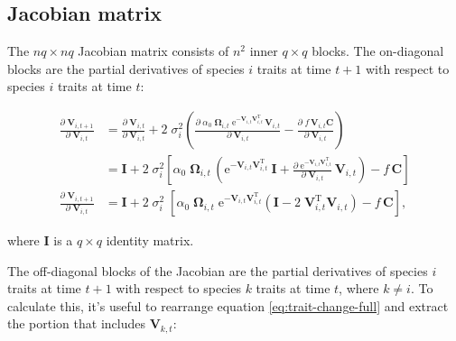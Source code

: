 \subsection*{Jacobian matrix}

The $nq \times nq$ Jacobian matrix consists of $n^2$ inner $q \times q$ blocks.
The on-diagonal blocks are the partial derivatives of species $i$ traits at time $t+1$ with respect
to species $i$ traits at time $t$:

\begin{equation*}
\begin{split}
    \frac{ \partial \; \mathbf{V}_{i,t+1} }{ \partial \; \mathbf{V}_{i,t} } &=
        \frac{ \partial \; \mathbf{V}_{i,t} }{ \partial \; \mathbf{V}_{i,t} } +
        2 \; \sigma_i^2
        \left(
            \frac{ \partial \;
                \alpha_0 \; \mathbf{\Omega}_{i,t} \;
                    \textrm{e}^{-\mathbf{V}_{i,t} \mathbf{V}_{i,t}^\textrm{T}} \,
                    \mathbf{V}_{i,t}}{\partial \; \mathbf{V}_{i,t} } -
            \frac{ \partial \; f \, \mathbf{V}_{i,t} \mathbf{C}}{\partial \; \mathbf{V}_{i,t} }
        \right) \\
    &=
        \mathbf{I} +
        2 \; \sigma_i^2
        \left[
            \alpha_0 \; \mathbf{\Omega}_{i,t} \,
            \left(
                \textrm{e}^{-\mathbf{V}_{i,t} \mathbf{V}_{i,t}^\textrm{T}} \: \mathbf{I} +
                \frac{ \partial \;
                        \textrm{e}^{-\mathbf{V}_{i,t} \mathbf{V}_{i,t}^\textrm{T}}
                        }{\partial \; \mathbf{V}_{i,t} } \, \mathbf{V}_{i,t}
            \right) -
            f \, \mathbf{C}
            \right] \\[2ex]
    \frac{ \partial \; \mathbf{V}_{i,t+1} }{ \partial \; \mathbf{V}_{i,t} } &= \mathbf{I} +
        2 \; \sigma_i^2 \;
        \left[
            \alpha_0 \; \mathbf{\Omega}_{i,t} \;
            \textrm{e}^{ - \mathbf{V}_{i,t} \mathbf{V}_{i,t}^{\textrm{T}} }
            \left(
                \mathbf{I} - 2 \; \mathbf{V}_{i,t}^{\textrm{T}} \mathbf{V}_{i,t}
            \right) -
            f \, \mathbf{C}
        \right]
    \textrm{,}
\end{split}
\end{equation*}

\noindent where $\mathbf{I}$ is a $q \times q$ identity matrix.


The off-diagonal blocks of the Jacobian are the partial derivatives of species $i$
traits at time $t+1$ with respect to species $k$ traits at time $t$, where $k \ne i$.
To calculate this, it's useful to rearrange equation \ref{eq:trait-change-full} and
extract the portion that includes $\mathbf{V}_{k,t}$:

